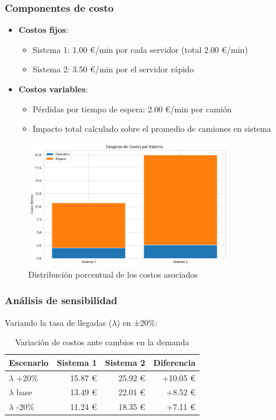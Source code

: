 \documentclass[a4paper, 12pt]{article}
\begin{document}
  \subsubsection{Componentes de costo}
  
  \begin{itemize}
  	\item \textbf{Costos fijos}:
  	\begin{itemize}
  		\item Sistema 1: 1.00 €/min por cada servidor (total 2.00 €/min)
  		\item Sistema 2: 3.50 €/min por el servidor rápido
  	\end{itemize}
  	
  	\item \textbf{Costos variables}:
  	\begin{itemize}
  		\item Pérdidas por tiempo de espera: 2.00 €/min por camión
  		\item Impacto total calculado sobre el promedio de camiones en sistema
  	\end{itemize}
  \end{itemize}
  
  \begin{figure}[H]
  	\centering
  	\includegraphics[width=0.8\textwidth]{figures/cost_breakdown.png}
  	\caption{Distribución porcentual de los costos asociados}
  	\label{fig:costos}
  \end{figure}
  
  \subsubsection{Análisis de sensibilidad}
  
  Variando la tasa de llegadas ($\lambda$) en ±20\%:
  
  \begin{table}[H]
  	\centering
  	\begin{tabular}{lrrr}
  		\toprule
  		\textbf{Escenario} & \textbf{Sistema 1} & \textbf{Sistema 2} & \textbf{Diferencia} \\
  		\midrule
  		$\lambda$ +20\% & 15.87 € & 25.92 € & +10.05 € \\
  		$\lambda$ base & 13.49 € & 22.01 € & +8.52 € \\
  		$\lambda$ -20\% & 11.24 € & 18.35 € & +7.11 € \\
  		\bottomrule
  	\end{tabular}
  	\caption{Variación de costos ante cambios en la demanda}
  	\label{tab:sensibilidad}
  \end{table}
  
\end{document}

